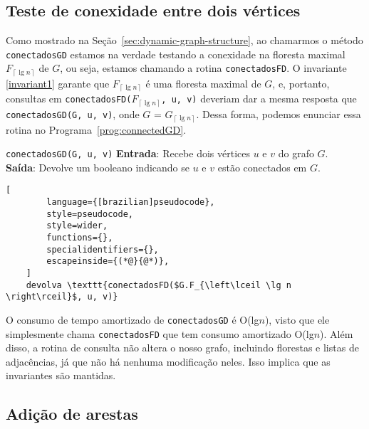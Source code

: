\subsection{Teste de conexidade entre dois vértices}
\label{sec:code-connectivity-test}

Como mostrado na Seção~\ref{sec:dynamic-graph-structure}, ao chamarmos o método \texttt{conectadosGD} estamos na verdade testando a conexidade na floresta maximal $F_{\left\lceil \lg n \right\rceil}$ de $G$, ou seja, estamos chamando a rotina \texttt{conectadosFD}. O invariante \ref{invariant1} garante que $F_{\left\lceil \lg n \right\rceil}$ é uma floresta maximal de $G$, e, portanto, consultas em 
\texttt{conectadosFD($F_{\left\lceil \lg n \right\rceil}$, u, v)} deveriam dar a mesma resposta que \texttt{conectadosGD(G, u, v)}, onde $G$ = $G_{\left\lceil \lg n \right\rceil}$. Dessa forma, podemos enunciar essa rotina no Programa~\ref{prog:connectedGD}.

\begin{programruledcaption}{\texttt{conectadosGD(G, u, v)} \label{prog:connectedGD}}
    \noindent\textbf{Entrada}: Recebe dois vértices $u$ e $v$ do grafo $G$. \\
    \textbf{Saída}: Devolve um booleano indicando se $u$ e $v$ estão conectados em $G$.
    \vspace{-0.5\baselineskip}
    \begin{lstlisting}[
        language={[brazilian]pseudocode},
        style=pseudocode,
        style=wider,
        functions={},
        specialidentifiers={},
        escapeinside={(*@}{@*)},
    ]
    devolva \texttt{conectadosFD($G.F_{\left\lceil \lg n \right\rceil}$, u, v)}
    \end{lstlisting}
    \vspace{-0.5\baselineskip}
\end{programruledcaption}

O consumo de tempo amortizado de \texttt{conectadosGD} é O(lg$n$), visto que ele simplesmente chama \texttt{conectadosFD} que tem consumo amortizado O(lg$n$). Além disso, a rotina de consulta não altera o nosso grafo, incluindo florestas e listas de adjacências, já que não há nenhuma modificação neles. Isso implica que as invariantes são mantidas. 

\subsection{Adição de arestas}
\label{sec:code-edge-addition}

